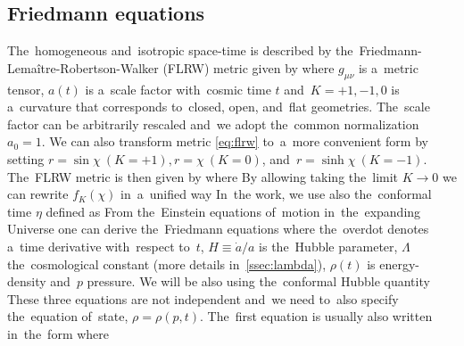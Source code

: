\subsection{Friedmann equations}
The~homogeneous and~isotropic space-time is described by the~Friedmann-Lema\^{i}tre-Robertson-Walker (FLRW) metric given by
where $g_{\mu\nu}$ is a~metric tensor, $a(t)$ is a~scale factor with~cosmic time $t$ and~$K=+1,-1,0$ is a~curvature that corresponds to~closed, open, and~flat geometries. The~scale factor can be arbitrarily rescaled and~we adopt the~common normalization $a_0=1$. We can also transform metric \eqref{eq:flrw} to~a~more convenient form by setting $r=\sin\chi\ (K=+1),r=\chi\ (K=0)$, and~$r=\sinh\chi\ (K=-1)$. The~FLRW metric is then given by
where
By allowing taking the~limit $K\to0$ we can rewrite $f_K(\chi)$ in~a~unified way
In~the work, we use also the~conformal time $\eta$ defined as
From the~Einstein equations of~motion in~the~expanding Universe one can derive the~Friedmann equations
where the~overdot denotes a~time derivative with~respect to~$t$, $H\equiv\dot a/a$ is the~Hubble parameter, $\Lambda$ the~cosmological constant (more details in~\autoref{ssec:lambda}), $\rho(t)$ is energy-density and~$p$ pressure. We will be also using the~conformal Hubble quantity
These three equations are not independent and~we need to~also specify the~equation of~state, $\rho=\rho(p,t)$. The~first equation is usually also written in~the~form
where

